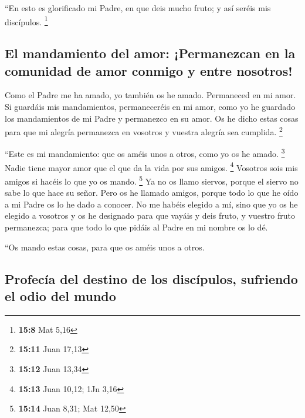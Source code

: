  ``En esto es glorificado mi Padre, en que deis mucho
fruto; y así seréis mis discípulos. \footnote{\textbf{15:8} Mat 5,16}

\hypertarget{el-mandamiento-del-amor-permanezcan-en-la-comunidad-de-amor-conmigo-y-entre-nosotros}{%
\subsection{El mandamiento del amor: ¡Permanezcan en la comunidad de
amor conmigo y entre
nosotros!}\label{el-mandamiento-del-amor-permanezcan-en-la-comunidad-de-amor-conmigo-y-entre-nosotros}}

 Como el Padre me ha amado, yo también os he amado.
Permaneced en mi amor.  Si guardáis mis mandamientos,
permaneceréis en mi amor, como yo he guardado los mandamientos de mi
Padre y permanezco en su amor.  Os he dicho estas cosas
para que mi alegría permanezca en vosotros y vuestra alegría sea
cumplida. \footnote{\textbf{15:11} Juan 17,13}

 ``Este es mi mandamiento: que os améis unos a otros,
como yo os he amado. \footnote{\textbf{15:12} Juan 13,34}
 Nadie tiene mayor amor que el que da la vida por sus
amigos. \footnote{\textbf{15:13} Juan 10,12; 1Jn 3,16} 
Vosotros sois mis amigos si hacéis lo que yo os mando. \footnote{\textbf{15:14}
  Juan 8,31; Mat 12,50}  Ya no os llamo siervos, porque
el siervo no sabe lo que hace su señor. Pero os he llamado amigos,
porque todo lo que he oído a mi Padre os lo he dado a conocer.
 No me habéis elegido a mí, sino que yo os he elegido a
vosotros y os he designado para que vayáis y deis fruto, y vuestro fruto
permanezca; para que todo lo que pidáis al Padre en mi nombre os lo dé.

 ``Os mando estas cosas, para que os améis unos a otros.

\hypertarget{profecuxeda-del-destino-de-los-discuxedpulos-sufriendo-el-odio-del-mundo}{%
\subsection{Profecía del destino de los discípulos, sufriendo el odio
del
mundo}\label{profecuxeda-del-destino-de-los-discuxedpulos-sufriendo-el-odio-del-mundo}}

